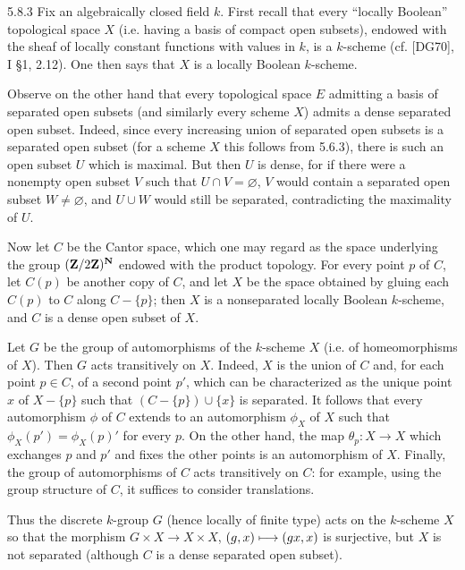 \begin{example}{5.8.3}\label{VIB.5.8.3}
Fix an algebraically closed field $k$. First recall that every ``locally Boolean'' topological space $X$ (i.e. having a basis of compact open subsets), endowed with the sheaf of locally constant functions with values in $k$, is a $k$-scheme (cf. [DG70], I §1, 2.12). One then says that $X$ is a locally Boolean $k$-scheme.

Observe on the other hand that every topological space $E$ admitting a basis of separated open subsets (and similarly every scheme $X$) admits a dense separated open subset. Indeed, since every increasing union of separated open subsets is a separated open subset (for a scheme $X$ this follows from 5.6.3), there is such an open subset $U$ which is maximal. But then $U$ is dense, for if there were a nonempty open subset $V$ such that $U\cap V=\varnothing$, $V$ would contain a separated open subset $W\ne\varnothing$, and $U\cup W$ would still be separated, contradicting the maximality of $U$.

Now let $C$ be the Cantor space, which one may regard as the space underlying the group $(\mathbf{Z}/2\mathbf{Z})^{\mathbf{N}}$ endowed with the product topology. For every point $p$ of $C$, let $C(p)$ be another copy of $C$, and let $X$ be the space obtained by gluing each $C(p)$ to $C$ along $C-\{p\}$; then $X$ is a nonseparated locally Boolean $k$-scheme, and $C$ is a dense open subset of $X$.

Let $G$ be the group of automorphisms of the $k$-scheme $X$ (i.e. of homeomorphisms of $X$). Then $G$ acts transitively on $X$. Indeed, $X$ is the union of $C$ and, for each point $p\in C$, of a second point $p'$, which can be characterized as the unique point $x$ of $X-\{p\}$ such that $(C-\{p\})\cup\{x\}$ is separated. It follows that every automorphism $\phi$ of $C$ extends to an automorphism $\phi_X$ of $X$ such that $\phi_X(p')=\phi_X(p)'$ for every $p$. On the other hand, the map $\theta_p:X\to X$ which exchanges $p$ and $p'$ and fixes the other points is an automorphism of $X$. Finally, the group of automorphisms of $C$ acts transitively on $C$: for example, using the group structure of $C$, it suffices to consider translations.

Thus the discrete $k$-group $G$ (hence locally of finite type) acts on the $k$-scheme $X$ so that the morphism $G\times X\to X\times X$, $(g,x)\longmapsto(gx,x)$ is surjective, but $X$ is not separated (although $C$ is a dense separated open subset).
\end{example}
